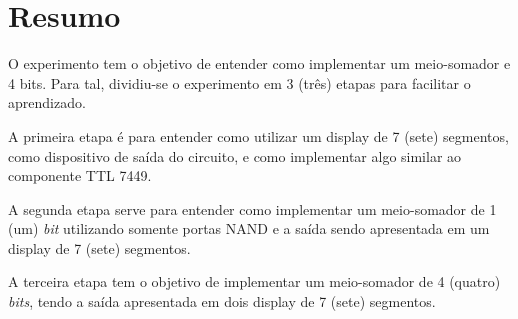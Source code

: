 \chapter{Resumo}

O experimento tem o objetivo de entender como implementar um meio-somador e 4 bits. Para tal, dividiu-se
o experimento em 3 (três) etapas para facilitar o aprendizado.

A primeira etapa é para entender como utilizar um display de 7 (sete) segmentos, como dispositivo
de saída do circuito, e como
implementar algo similar ao componente TTL 7449.

A segunda etapa serve para entender como implementar um meio-somador de 1 (um) \textit{bit} utilizando
somente portas NAND e a saída sendo apresentada em um display de 7 (sete) segmentos.

A terceira etapa tem o objetivo de implementar um meio-somador de 4 (quatro) \textit{bits}, tendo
 a saída apresentada em dois display de 7 (sete) segmentos.


